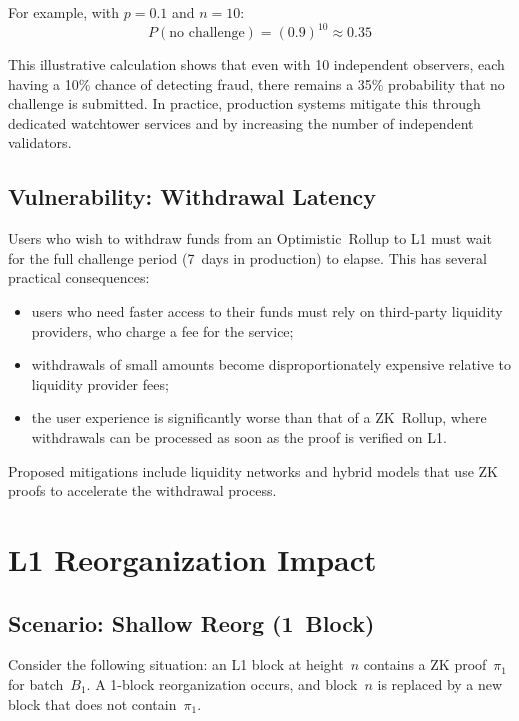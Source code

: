For example, with $p = 0.1$ and $n = 10$:
\begin{equation}
P(\text{no challenge}) = (0.9)^{10} \approx 0.35
\end{equation}

This illustrative calculation shows that even with 10 independent observers, each having a 10\% chance of detecting fraud, there remains a 35\% probability that no challenge is submitted. In practice, production systems mitigate this through dedicated watchtower services and by increasing the number of independent validators.

\subsection{Vulnerability: Withdrawal Latency}

Users who wish to withdraw funds from an Optimistic~Rollup to L1 must wait for the full challenge period (7~days in production) to elapse. This has several practical consequences:
\begin{itemize}
    \item users who need faster access to their funds must rely on third-party liquidity providers, who charge a fee for the service;
    \item withdrawals of small amounts become disproportionately expensive relative to liquidity provider fees;
    \item the user experience is significantly worse than that of a ZK~Rollup, where withdrawals can be processed as soon as the proof is verified on L1.
\end{itemize}

Proposed mitigations include liquidity networks and hybrid models that use ZK proofs to accelerate the withdrawal process.

\section{L1 Reorganization Impact}

\subsection{Scenario: Shallow Reorg (1~Block)}

Consider the following situation: an L1 block at height~$n$ contains a ZK proof~$\pi_1$ for batch~$B_1$. A 1-block reorganization occurs, and block~$n$ is replaced by a new block that does not contain~$\pi_1$.

